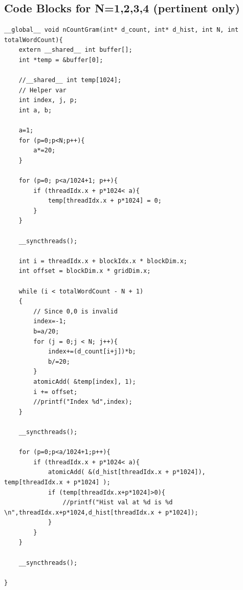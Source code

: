 \subsection {Code Blocks for N=1,2,3,4 (pertinent only)}
\begin{lstlisting}
__global__ void nCountGram(int* d_count, int* d_hist, int N, int totalWordCount){
    extern __shared__ int buffer[];
    int *temp = &buffer[0];

    //__shared__ int temp[1024];
    // Helper var
    int index, j, p;
    int a, b;

    a=1;
    for (p=0;p<N;p++){
        a*=20;
    }

    for (p=0; p<a/1024+1; p++){
        if (threadIdx.x + p*1024< a){
            temp[threadIdx.x + p*1024] = 0;
        }
    }

    __syncthreads();

    int i = threadIdx.x + blockIdx.x * blockDim.x;
    int offset = blockDim.x * gridDim.x;

    while (i < totalWordCount - N + 1)
    {
        // Since 0,0 is invalid
        index=-1;
        b=a/20;
        for (j = 0;j < N; j++){
            index+=(d_count[i+j])*b;
            b/=20;
        }
        atomicAdd( &temp[index], 1);
        i += offset;
        //printf("Index %d",index);
    }

    __syncthreads();

    for (p=0;p<a/1024+1;p++){
        if (threadIdx.x + p*1024< a){
            atomicAdd( &(d_hist[threadIdx.x + p*1024]), temp[threadIdx.x + p*1024] );
            if (temp[threadIdx.x+p*1024]>0){
                //printf("Hist val at %d is %d \n",threadIdx.x+p*1024,d_hist[threadIdx.x + p*1024]);
            }
        }
    }

    __syncthreads();

}

\end{lstlisting}
\bigskip

